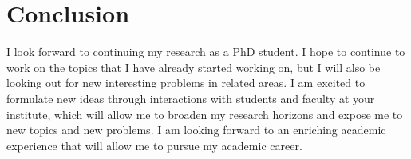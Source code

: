 \section*{Conclusion}
\label{sec:conclusion}

I look forward to continuing my research as a PhD student.
I hope to continue to work on the topics that I have already started working on,
but I will also be looking out for new interesting problems in related areas.
I am excited to formulate new ideas through interactions with students and faculty at your institute,
which will allow me to broaden my research horizons and expose me to new topics and new problems.
I am looking forward to an enriching academic experience that will allow me to pursue my academic career.
